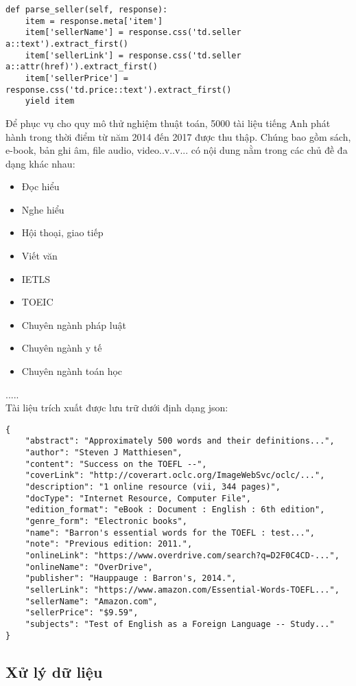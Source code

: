 \begin{lstlisting}[style=pythoncode, breaklines=true]
  def parse_seller(self, response):
	item = response.meta['item']
	item['sellerName'] = response.css('td.seller a::text').extract_first()
	item['sellerLink'] = response.css('td.seller a::attr(href)').extract_first()
	item['sellerPrice'] = response.css('td.price::text').extract_first()		
	yield item
\end{lstlisting}

Để phục vụ cho quy mô thử nghiệm thuật toán, 5000 tài liệu tiếng Anh phát hành trong thời điểm từ năm 2014 đến 2017 được thu thập. Chúng bao gồm sách, e-book, bản ghi âm, file audio, video..v..v... có nội dung nằm trong các chủ đề đa dạng khác nhau:

\begin{itemize}
	\item Đọc hiểu
	\item Nghe hiểu
	\item Hội thoại, giao tiếp
	\item Viết văn
	\item IETLS
	\item TOEIC
	\item Chuyên ngành pháp luật
	\item Chuyên ngành y tế
	\item Chuyên ngành toán học
\end{itemize}

.....\\

Tài liệu trích xuất được lưu trữ dưới định dạng json:

\begin{lstlisting}[style=pythoncode]
{
	"abstract": "Approximately 500 words and their definitions...", 
	"author": "Steven J Matthiesen", 
	"content": "Success on the TOEFL --", 
	"coverLink": "http://coverart.oclc.org/ImageWebSvc/oclc/...", 
	"description": "1 online resource (vii, 344 pages)", 
	"docType": "Internet Resource, Computer File", 
	"edition_format": "eBook : Document : English : 6th edition", 
	"genre_form": "Electronic books", 
	"name": "Barron's essential words for the TOEFL : test...", 
	"note": "Previous edition: 2011.", 
	"onlineLink": "https://www.overdrive.com/search?q=D2F0C4CD-...", 
	"onlineName": "OverDrive", 
	"publisher": "Hauppauge : Barron's, 2014.", 
	"sellerLink": "https://www.amazon.com/Essential-Words-TOEFL...", 
	"sellerName": "Amazon.com", 
	"sellerPrice": "$9.59", 
	"subjects": "Test of English as a Foreign Language -- Study..."
}
\end{lstlisting}

\subsection{Xử lý dữ liệu}

